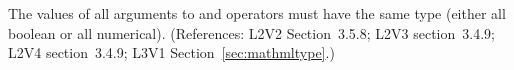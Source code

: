 The values of all arguments to  and  operators must
have the same type (either all boolean or all numerical).
(References: L2V2 Section~3.5.8; L2V3 section~3.4.9; L2V4 section~3.4.9; 
L3V1 Section~\ref{sec:mathmltype}.)
